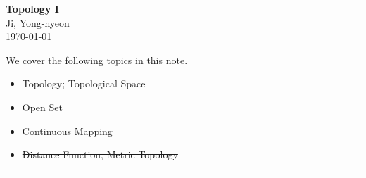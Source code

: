 \documentclass[11pt,openany]{article}
\begin{document}
\begin{center}
	\huge\textbf{Topology I}\\
	\vspace{0.5em}
	\large{Ji, Yong-hyeon}\\
	\vspace{0.5em}
	\normalsize{\today}\\
\end{center}

\noindent 
We cover the following topics in this note.
\begin{itemize}
	\item Topology; Topological Space
	\item Open Set
	\item Continuous Mapping
	\item \st{Distance Function; Metric Topology}
\end{itemize}
\hrule\vspace{12pt}
\end{document}
